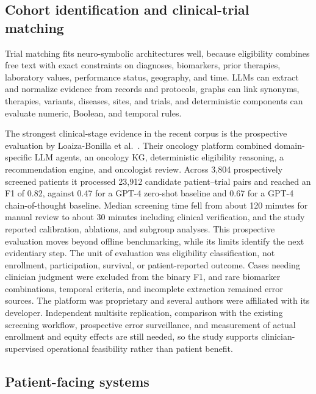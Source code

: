 \subsection{Cohort identification and clinical-trial matching}

Trial matching fits neuro-symbolic architectures well, because eligibility combines free text with exact constraints on diagnoses, biomarkers, prior therapies, laboratory values, performance status, geography, and time. LLMs can extract and normalize evidence from records and protocols, graphs can link synonyms, therapies, variants, diseases, sites, and trials, and deterministic components can evaluate numeric, Boolean, and temporal rules.

The strongest clinical-stage evidence in the recent corpus is the prospective evaluation by Loaiza-Bonilla et al.~\cite{loaizabonilla2026trialmatch}. Their oncology platform combined domain-specific LLM agents, an oncology KG, deterministic eligibility reasoning, a recommendation engine, and oncologist review. Across 3{,}804 prospectively screened patients it processed 23{,}912 candidate patient--trial pairs and reached an F1 of 0.82, against 0.47 for a GPT-4 zero-shot baseline and 0.67 for a GPT-4 chain-of-thought baseline. Median screening time fell from about 120 minutes for manual review to about 30 minutes including clinical verification, and the study reported calibration, ablations, and subgroup analyses. This prospective evaluation moves beyond offline benchmarking, while its limits identify the next evidentiary step. The unit of evaluation was eligibility classification, not enrollment, participation, survival, or patient-reported outcome. Cases needing clinician judgment were excluded from the binary F1, and rare biomarker combinations, temporal criteria, and incomplete extraction remained error sources. The platform was proprietary and several authors were affiliated with its developer. Independent multisite replication, comparison with the existing screening workflow, prospective error surveillance, and measurement of actual enrollment and equity effects are still needed, so the study supports clinician-supervised operational feasibility rather than patient benefit.

\subsection{Patient-facing systems}

